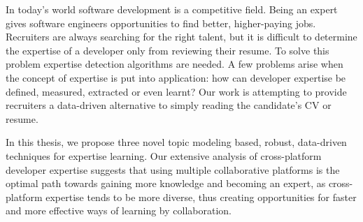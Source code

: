In today's world software development is a competitive field. Being an expert gives software engineers opportunities to find better, higher-paying jobs. Recruiters are always searching for the right talent, but it is difficult to determine the expertise of a developer only from reviewing their resume. To solve this problem expertise detection algorithms are needed. A few problems arise when the concept of expertise is put into application: how can developer expertise be defined, measured, extracted or even learnt? Our work is attempting to provide recruiters a data-driven alternative to simply reading the candidate's CV or resume. 

In this thesis, we propose three novel topic modeling based, robust, data-driven techniques for expertise learning. Our extensive analysis of cross-platform developer expertise suggests that using multiple collaborative platforms is the optimal path towards gaining more knowledge and becoming an expert, as cross-platform expertise tends to be more diverse, thus creating opportunities for faster and more effective ways of learning by collaboration.
